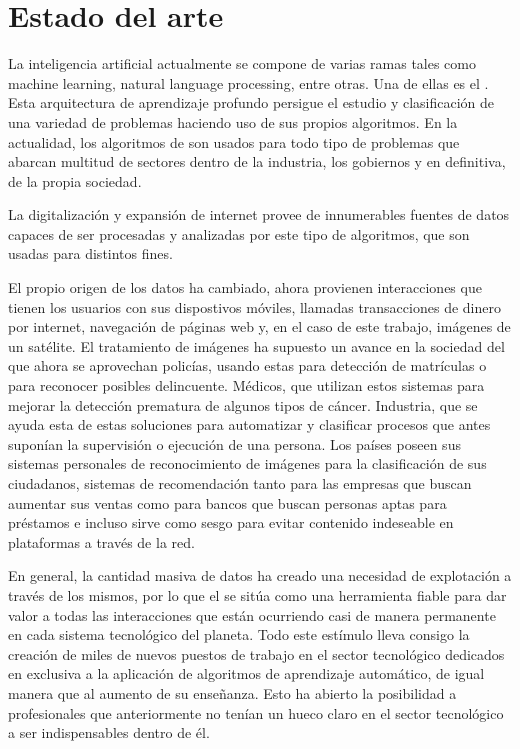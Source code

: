 \section{Estado del arte}\label{sec:estado-del-arte}
La inteligencia artificial actualmente se compone de varias ramas tales como machine learning, natural language processing, entre otras.
Una de ellas es el .
Esta arquitectura de aprendizaje profundo persigue el estudio y clasificación de una variedad de problemas
haciendo uso de sus propios algoritmos.
En la actualidad, los algoritmos de  son usados para todo tipo de problemas que abarcan multitud de sectores dentro de la industria, los gobiernos y en definitiva, de la propia sociedad.

La digitalización y expansión de internet provee de innumerables fuentes de datos capaces de ser procesadas y analizadas por este tipo de algoritmos, que son usadas para distintos fines.

El propio origen de los datos ha cambiado, ahora provienen interacciones que tienen los usuarios con sus dispostivos móviles, llamadas
transacciones de dinero por internet, navegación de páginas web y, en el caso de este trabajo, imágenes de un satélite.
El tratamiento de imágenes ha supuesto un avance en la sociedad del que ahora se aprovechan policías, usando estas para detección de matrículas o para reconocer posibles delincuente.
Médicos, que utilizan estos sistemas para mejorar la detección prematura de algunos tipos de cáncer.
Industria, que se ayuda esta de estas soluciones para automatizar y clasificar procesos que antes suponían la supervisión o ejecución de una persona.
Los países poseen sus sistemas personales de reconocimiento de imágenes para la clasificación de sus ciudadanos, sistemas de recomendación tanto para las empresas que buscan aumentar sus ventas como para bancos que buscan personas aptas para préstamos e incluso sirve como sesgo para evitar contenido indeseable en plataformas a través de la red.


En general, la cantidad masiva de datos ha creado una necesidad de explotación a
través de los mismos, por lo que el  se sitúa como una herramienta fiable para dar valor a todas las interacciones que están ocurriendo casi de manera permanente
en cada sistema tecnológico del planeta.
Todo este estímulo lleva consigo la creación de miles de nuevos puestos de trabajo en el sector tecnológico dedicados en exclusiva a la aplicación de algoritmos de aprendizaje automático, de igual manera que al aumento de su enseñanza.
Esto ha abierto la posibilidad a profesionales que anteriormente no tenían un hueco claro en el sector tecnológico a ser indispensables dentro de él.

